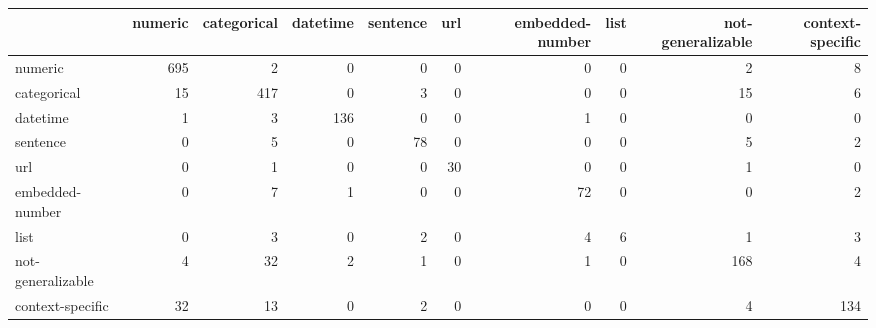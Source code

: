 \begin{tabular}{lrrrrrrrrr}
\toprule
{} &  numeric &  categorical &  datetime &  sentence &  url &  embedded-number &  list &  not-generalizable &  context-specific \\
\midrule
numeric           &      695 &            2 &         0 &         0 &    0 &                0 &     0 &                  2 &                 8 \\
categorical       &       15 &          417 &         0 &         3 &    0 &                0 &     0 &                 15 &                 6 \\
datetime          &        1 &            3 &       136 &         0 &    0 &                1 &     0 &                  0 &                 0 \\
sentence          &        0 &            5 &         0 &        78 &    0 &                0 &     0 &                  5 &                 2 \\
url               &        0 &            1 &         0 &         0 &   30 &                0 &     0 &                  1 &                 0 \\
embedded-number   &        0 &            7 &         1 &         0 &    0 &               72 &     0 &                  0 &                 2 \\
list              &        0 &            3 &         0 &         2 &    0 &                4 &     6 &                  1 &                 3 \\
not-generalizable &        4 &           32 &         2 &         1 &    0 &                1 &     0 &                168 &                 4 \\
context-specific  &       32 &           13 &         0 &         2 &    0 &                0 &     0 &                  4 &               134 \\
\bottomrule
\end{tabular}
